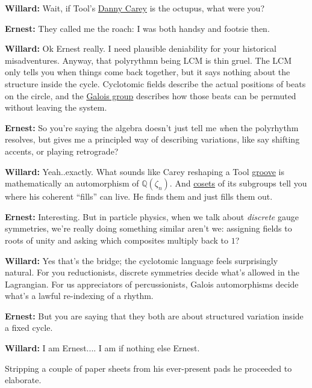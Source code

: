 \noindent
\textbf{Willard:} Wait, if Tool's \href{https://colab.research.google.com/drive/19xktDjsgSyxtsq5Xda68e4hnJlX73QFv?usp=sharing}{Danny Carey} is the octupus, what were you?

\noindent
\textbf{Ernest:} They called me the roach: I was both handsy and footsie then.

\noindent
\textbf{Willard:} Ok Ernest really. I need plausible deniability for your historical misadventures. Anyway, that polyrythmn being LCM is thin gruel. The LCM only tells you when things come back together, but it says nothing about the structure inside the cycle. Cyclotomic fields describe the actual positions of beats on the circle, and the \href{https://ncatlab.org/nlab/show/Galois+group}{Galois group} describes how those beats can be permuted without leaving the system.  

\noindent
\textbf{Ernest:} So you’re saying the algebra doesn’t just tell me {\emph when} the polyrhythm resolves, but gives me a principled way of describing variations, like say shifting accents, or playing retrograde?

\noindent
\textbf{Willard:} Yeah..exactly. What sounds like Carey reshaping a Tool \href{https://colab.research.google.com/drive/1IzcFq7qrFRvtklaYFgDmtMZumzBTYPB_?usp=sharing}{groove} is mathematically an automorphism of $\mathbb{Q}(\zeta_n)$. And \href{https://sites.ualberta.ca/~vbouchar/MAPH464/section-cosets.html}{cosets} of its subgroups tell you where his coherent “fills” can live. He finds them and just fills them out.

\noindent
\textbf{Ernest:} Interesting. But in particle physics, when we talk about {\em discrete} gauge symmetries, we're really doing something similar aren't we: assigning fields to roots of unity and asking which composites multiply back to $1$? 

\noindent
\textbf{Willard:} Yes that’s the bridge; the cyclotomic language feels surprisingly natural. For you reductionists, discrete symmetries decide what’s allowed in the Lagrangian. For us appreciators of percussionists, Galois automorphisms decide what’s a lawful re-indexing of a rhythm.

\noindent
\textbf{Ernest:} But you are saying that they both are about structured variation inside a fixed cycle.

\noindent
\textbf{Willard:} I am Ernest.... I am if nothing else Ernest.  
\bigskip

Stripping a couple of paper sheets from his ever-present pads he proceeded to elaborate.

